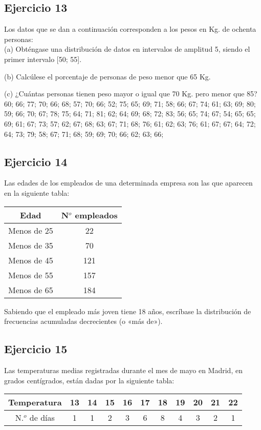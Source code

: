 \documentclass[11pt,letterpaper]{report}
\begin{document}
      \subsection*{Ejercicio 13}
        Los datos que se dan a continuación corresponden a los pesos en Kg. de ochenta personas:\\

        (a) Obténgase una distribución de datos en intervalos de amplitud 5, siendo el primer intervalo [50; 55].

        (b) Calcúlese el porcentaje de personas de peso menor que 65 Kg.

        (c) ¿Cuántas personas tienen peso mayor o igual que 70 Kg. pero menor que 85? \\

        60; 66; 77; 70; 66; 68; 57; 70; 66; 52; 75; 65; 69; 71; 58; 66; 67; 74; 61; 63; 69; 80; 59; 66; 70; 67; 78; 75; 64; 71; 81; 62; 64; 69; 68; 72; 83; 56; 65; 74; 67; 54; 65; 65; 69; 61; 67; 73; 57; 62; 67; 68; 63; 67; 71; 68; 76;
        61; 62; 63; 76; 61; 67; 67; 64; 72; 64; 73; 79; 58; 67; 71; 68; 59; 69; 70; 66; 62; 63; 66;
      \subsection*{Ejercicio 14}
        Las edades de los empleados de una determinada empresa son las que aparecen en la siguiente tabla:

        \begin{table}[!h]
          \centering
          \begin{tabular}{|c|c|}
              \hline
              Edad & N$^o$ empleados   \\
              \hline
              Menos de 25 & 22 \\
              Menos de 35 & 70 \\
              Menos de 45 & 121\\
              Menos de 55 & 157\\
              Menos de 65 & 184\\
              \hline
          \end{tabular}
        \end{table}

        Sabiendo que el empleado más joven tiene 18 años, escríbase la distribución de frecuencias acumuladas decrecientes (o «más de»).
      \subsection*{Ejercicio 15}
        Las temperaturas medias registradas durante el mes de mayo en Madrid, en grados centígrados, están dadas por la siguiente tabla:
        \begin{table}[!h]
            \centering
            \begin{tabular}{|c|c|c|c|c|c|c|c|c|c|c|}
                \hline
                Temperatura & 13 &14& 15& 16& 17 &18& 19& 20& 21& 22  \\
                \hline
               N.$^o$ de días &1 &1 &2 &3 &6 &8 &4 &3 &2& 1   \\
                \hline
            \end{tabular}
        \end{table}
\end{document}
